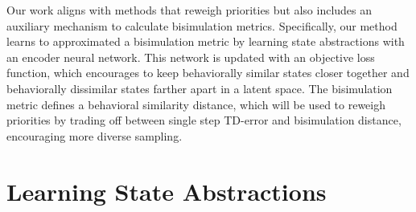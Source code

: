 
Our work aligns with methods that reweigh priorities but also includes an auxiliary mechanism to calculate bisimulation metrics. Specifically, our method learns to approximated a bisimulation metric by learning state abstractions with an encoder neural network. This network is updated with an objective loss function, which encourages to keep behaviorally similar states closer together and behaviorally dissimilar states farther apart in a latent space. The bisimulation metric defines a behavioral similarity distance, which will be used to reweigh priorities by trading off between single step TD-error and bisimulation distance, encouraging more diverse sampling.





\section{Learning State Abstractions}

